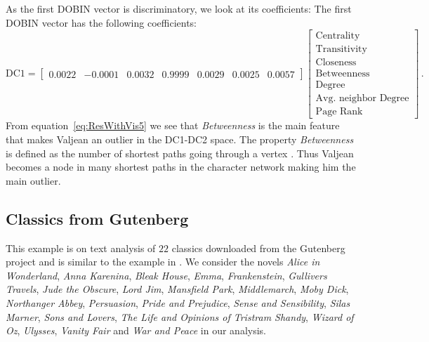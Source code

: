\documentclass[letter,12pt]{article}
\begin{document}
As the first DOBIN vector is discriminatory, we look at its coefficients:
The first DOBIN vector has the following coefficients:
\begin{equation}\label{eq:ResWithVis5}
	\text{DC1} = \begin{bmatrix}
		0.0022 & -0.0001 & 0.0032 & 0.9999 & 0.0029 & 0.0025 & 0.0057
	\end{bmatrix}
	\begin{bmatrix}
		\text{Centrality}            \\
		\text{Transitivity}          \\
		\text{Closeness}             \\
		\text{Betweenness}           \\
		\text{Degree}                \\
		\text{Avg. neighbor Degree} \\
		\text{Page Rank}
	\end{bmatrix} \, .
\end{equation}
From equation~\eqref{eq:ResWithVis5} we see that \textit{Betweenness} is the main feature that makes Valjean an outlier in the DC1-DC2 space. The property \textit{Betweenness} is defined as the number of shortest paths going through a vertex \citep{igraph}. Thus Valjean becomes a node in many shortest paths in the character network making him the main outlier.

\subsection{Classics from Gutenberg}\label{sec:ResWithVis6}

This example is on text analysis of $22$ classics downloaded from the Gutenberg project \citep{gutenberg} and is similar to the example in \cite{wilkinson2017visualizing}. We consider the novels \textit{Alice in Wonderland}, \textit{Anna Karenina}, \textit{Bleak House}, \textit{Emma}, \textit{Frankenstein}, \textit{Gullivers Travels}, \textit{Jude the Obscure}, \textit{Lord Jim}, \textit{Mansfield Park}, \textit{Middlemarch}, \textit{Moby Dick}, \textit{Northanger Abbey}, \textit{Persuasion}, \textit{Pride and Prejudice}, \textit{Sense and Sensibility}, \textit{Silas Marner}, \textit{Sons and Lovers}, \textit{The Life and Opinions of Tristram Shandy}, \textit{Wizard of Oz}, \textit{Ulysses}, \textit{Vanity Fair} and \textit{War and Peace} in our analysis.
\end{document}
